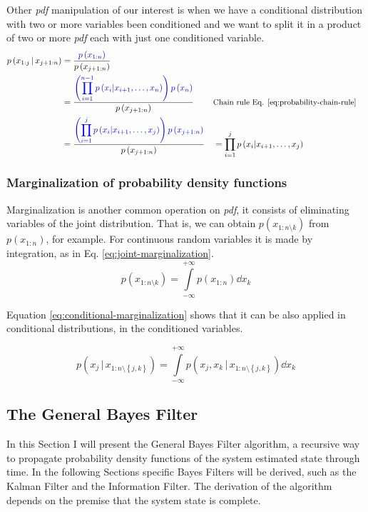 \documentclass[12pt]{article}
\newcommand{\given}{\,|\,} %
\newcommand{\cbrac}[1]{\left\{#1\right\}} %
\newcommand{\parentheses}[1]{\left(#1\right)}
\newcommand{\pr}[1]{p\parentheses{#1}}
\newcommand{\Int}[4][x]{\int\limits_{#2}^{#3} #4 \dd #1}
\newcommand{\blue}[1]{\color{blue}#1\color{black}}
\begin{document}
Other \textit{pdf} manipulation of our interest is when we have a conditional distribution with two or more variables been conditioned and we want to split it in a product of two or more \textit{pdf} each with just one conditioned variable. 
\begin{equation}
\begin{aligned}
    \pr{x_{1:j} \given x_{j+1:n}} &=  \dfrac{\blue{\pr{x_{1:n}}}}{\pr{x_{j+1:n}}} \\
    &= \dfrac{\displaystyle\blue{ \left(\prod_{i = 1}^{n-1} \pr{x_i | x_{i+1}, \dots, x_n} \right) \pr{x_n} } }{\pr{x_{j+1:n}}} && \small\text{Chain rule Eq. \ref{eq:probability-chain-rule}} \\
    &= \dfrac{\displaystyle \blue{ \left(\prod_{i = 1}^{j} \pr{x_i | x_{i+1}, \dots, x_j} \right) \pr{x_{j+1:n}} } }{\pr{x_{j+1:n}}} &&= \prod_{i = 1}^{j} \pr{x_i | x_{i+1}, \dots, x_j}
\end{aligned}
\label{eq:conditional-manipulation-2}
\end{equation}

\subsubsection{Marginalization of probability density functions}
Marginalization is another common operation on \textit{pdf}, it consists of eliminating variables of the joint distribution. That is, we can obtain $\pr{x_{1:n \setminus k}}$ from $\pr{x_{1:n}}$, for example. For continuous random variables it is made by integration, as in Eq. \ref{eq:joint-marginalization}.
\begin{equation}
    \pr{x_{1:n \setminus k}} = \Int[x_k]{-\infty}{+\infty}{\pr{x_{1:n}}}
    \label{eq:joint-marginalization}
\end{equation}

Equation \ref{eq:conditional-marginalization} shows that it can be also applied in conditional distributions, in the conditioned variables.

\begin{equation}
    \pr{x_j \given x_{1:n \setminus \cbrac{j, k}}} =  \Int[x_k]{-\infty}{+\infty}{\pr{x_j, x_k \given x_{1:n \setminus \cbrac{j, k}}} }
    \label{eq:conditional-marginalization}
\end{equation}

\subsection{The General Bayes Filter}
\label{sec:bayes-filter}
In this Section I will present the General Bayes Filter algorithm, a recursive way to propagate probability density functions of the system estimated state through time. In the following Sections specific Bayes Filters will be derived, such as the Kalman Filter and the Information Filter. The derivation of the algorithm depends on the premise that the system state is complete.
\end{document}
